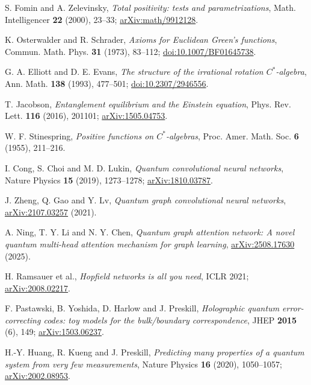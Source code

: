 S. Fomin and A. Zelevinsky, \emph{Total positivity: tests and parametrizations},
Math. Intelligencer \textbf{22} (2000), 23--33;
\href{https://arxiv.org/abs/math/9912128}{arXiv:math/9912128}.

K. Osterwalder and R. Schrader, \emph{Axioms for Euclidean Green's functions},
Commun. Math. Phys. \textbf{31} (1973), 83--112;
\href{https://doi.org/10.1007/BF01645738}{doi:10.1007/BF01645738}.

G. A. Elliott and D. E. Evans, \emph{The structure of the irrational rotation
$C^*$-algebra}, Ann. Math. \textbf{138} (1993), 477--501;
\href{https://doi.org/10.2307/2946556}{doi:10.2307/2946556}.

T. Jacobson, \emph{Entanglement equilibrium and the Einstein equation},
Phys. Rev. Lett. \textbf{116} (2016), 201101;
\href{https://arxiv.org/abs/1505.04753}{arXiv:1505.04753}.

W. F. Stinespring, \emph{Positive functions on $C^*$-algebras},
Proc. Amer. Math. Soc. \textbf{6} (1955), 211--216.

I. Cong, S. Choi and M. D. Lukin, \emph{Quantum convolutional neural networks},
Nature Physics \textbf{15} (2019), 1273--1278;
\href{https://arxiv.org/abs/1810.03787}{arXiv:1810.03787}.

J. Zheng, Q. Gao and Y. Lv, \emph{Quantum graph convolutional neural networks},
\href{https://arxiv.org/abs/2107.03257}{arXiv:2107.03257} (2021).

A. Ning, T. Y. Li and N. Y. Chen, \emph{Quantum graph attention network:
A novel quantum multi-head attention mechanism for graph learning},
\href{https://arxiv.org/abs/2508.17630}{arXiv:2508.17630} (2025).

H. Ramsauer et al., \emph{Hopfield networks is all you need}, ICLR 2021;
\href{https://arxiv.org/abs/2008.02217}{arXiv:2008.02217}.

F. Pastawski, B. Yoshida, D. Harlow and J. Preskill, \emph{Holographic quantum
error-correcting codes: toy models for the bulk/boundary correspondence},
JHEP \textbf{2015} (6), 149;
\href{https://arxiv.org/abs/1503.06237}{arXiv:1503.06237}.

H.-Y. Huang, R. Kueng and J. Preskill, \emph{Predicting many properties of a
quantum system from very few measurements}, Nature Physics \textbf{16}
(2020), 1050--1057;
\href{https://arxiv.org/abs/2002.08953}{arXiv:2002.08953}.

